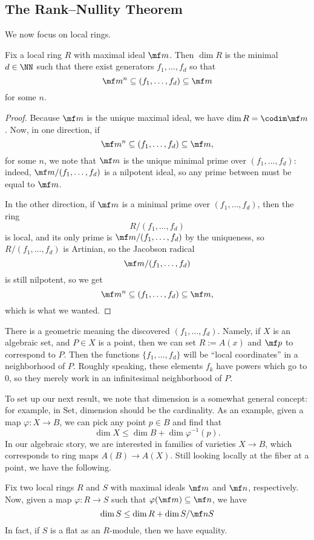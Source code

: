 \subsection{The Rank--Nullity Theorem}
We now focus on local rings.
\begin{proposition} \label{prop:localdimension}
	Fix a local ring $R$ with maximal ideal $\mf m$. Then $\dim R$ is the minimal $d\in\NN$ such that there exist generators $f_1,\ldots,f_d$ so that
	\[\mf m^n\subseteq(f_1,\ldots,f_d)\subseteq\mf m\]
	for some $n$.
\end{proposition}
\begin{proof}
	Because $\mf m$ is the unique maximal ideal, we have $\dim R=\codim\mf m$. Now, in one direction, if
	\[\mf m^n\subseteq(f_1,\ldots,f_d)\subseteq\mf m,\]
	for some $n$, we note that $\mf m$ is the unique minimal prime over $(f_1,\ldots,f_d)$: indeed, $\mf m/(f_1,\ldots,f_d)$ is a nilpotent ideal, so any prime between must be equal to $\mf m$.
	
	In the other direction, if $\mf m$ is a minimal prime over $(f_1,\ldots,f_d)$, then the ring
	\[R/(f_1,\ldots,f_d)\]
	is local, and its only prime is $\mf m/(f_1,\ldots,f_d)$ by the uniqueness, so $R/(f_1,\ldots,f_d)$ is Artinian, so the Jacobson radical
	\[\mf m/(f_1,\ldots,f_d)\]
	is still nilpotent, so we get
	\[\mf m^n\subseteq(f_1,\ldots,f_d)\subseteq\mf m,\]
	which is what we wanted.
\end{proof}
\begin{remark}
	There is a geometric meaning the discovered $(f_1,\ldots,f_d)$. Namely, if $X$ is an algebraic set, and $P\in X$ is a point, then we can set $R:=A(x)$ and $\mf p$ to correspond to $P$. Then the functions $\{f_1,\ldots,f_d\}$ will be ``local coordinates'' in a neighborhood of $P$. Roughly speaking, these elements $f_k$ have powers which go to $0$, so they merely work in an infinitesimal neighborhood of $P$.
\end{remark}
To set up our next result, we note that dimension is a somewhat general concept: for example, in $\mathrm{Set}$, dimension should be the cardinality. As an example, given a map $\varphi:X\to B$, we can pick any point $p\in B$ and find that
\[\dim X\le\dim B+\dim\varphi^{-1}(p).\] %
In our algebraic story, we are interested in families of varieties $X\to B$, which corresponds to ring maps $A(B)\to A(X)$. Still looking locally at the fiber at a point, we have the following.
\begin{proposition} \label{prop:ranknullity}
	Fix two local rings $R$ and $S$ with maximal ideals $\mf m$ and $\mf n$, respectively. Now, given a map $\varphi:R\to S$ such that $\varphi(\mf m)\subseteq\mf n$, we have
	\[\dim S\le\dim R+\dim S/\mf nS\]
	In fact, if $S$ is a flat as an $R$-module, then we have equality.
\end{proposition}
